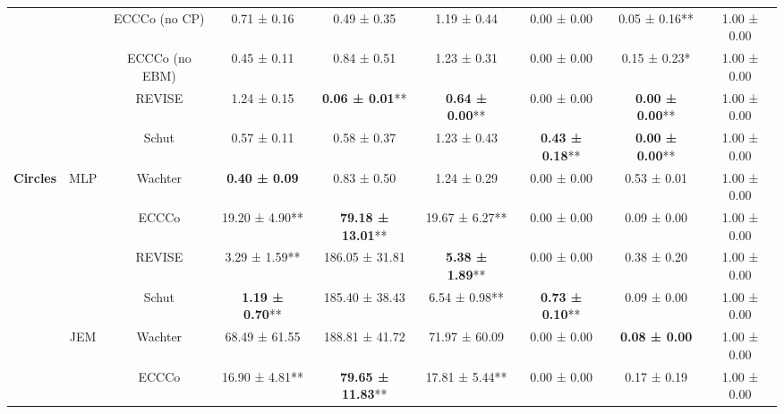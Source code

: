 \begin{table}
{\begin{tabular}[t]{>{}c|c|c|c|c|c|c|c|c}
 &  & ECCCo (no CP) & 0.71 ± 0.16\hphantom{*}\hphantom{*} & 0.49 ± 0.35\hphantom{*}\hphantom{*} & 1.19 ± 0.44\hphantom{*}\hphantom{*} & 0.00 ± 0.00\hphantom{*}\hphantom{*} & 0.05 ± 0.16** & 1.00 ± 0.00\hphantom{*}\hphantom{*}\\

 &  & ECCCo (no EBM) & 0.45 ± 0.11\hphantom{*}\hphantom{*} & 0.84 ± 0.51\hphantom{*}\hphantom{*} & 1.23 ± 0.31\hphantom{*}\hphantom{*} & 0.00 ± 0.00\hphantom{*}\hphantom{*} & 0.15 ± 0.23*\hphantom{*} & 1.00 ± 0.00\hphantom{*}\hphantom{*}\\

 &  & REVISE & 1.24 ± 0.15\hphantom{*}\hphantom{*} & \textbf{0.06 ± 0.01}** & \textbf{0.64 ± 0.00}** & 0.00 ± 0.00\hphantom{*}\hphantom{*} & \textbf{0.00 ± 0.00}** & 1.00 ± 0.00\hphantom{*}\hphantom{*}\\

 &  & Schut & 0.57 ± 0.11\hphantom{*}\hphantom{*} & 0.58 ± 0.37\hphantom{*}\hphantom{*} & 1.23 ± 0.43\hphantom{*}\hphantom{*} & \textbf{0.43 ± 0.18}** & \textbf{0.00 ± 0.00}** & 1.00 ± 0.00\hphantom{*}\hphantom{*}\\

\multirow{-12}{*}{\centering\arraybackslash \textbf{Circles}} & \multirow{-6}{*}{\centering\arraybackslash MLP} & Wachter & \textbf{0.40 ± 0.09}\hphantom{*}\hphantom{*} & 0.83 ± 0.50\hphantom{*}\hphantom{*} & 1.24 ± 0.29\hphantom{*}\hphantom{*} & 0.00 ± 0.00\hphantom{*}\hphantom{*} & 0.53 ± 0.01\hphantom{*}\hphantom{*} & 1.00 ± 0.00\hphantom{*}\hphantom{*}\\
\cline{1-9}
 &  & ECCCo & 19.20 ± 4.90** & \textbf{79.18 ± 13.01}** & 19.67 ± 6.27** & 0.00 ± 0.00\hphantom{*}\hphantom{*} & 0.09 ± 0.00\hphantom{*}\hphantom{*} & 1.00 ± 0.00\hphantom{*}\hphantom{*}\\

 &  & REVISE & 3.29 ± 1.59** & 186.05 ± 31.81\hphantom{*}\hphantom{*} & \textbf{5.38 ± 1.89}** & 0.00 ± 0.00\hphantom{*}\hphantom{*} & 0.38 ± 0.20\hphantom{*}\hphantom{*} & 1.00 ± 0.00\hphantom{*}\hphantom{*}\\

 &  & Schut & \textbf{1.19 ± 0.70}** & 185.40 ± 38.43\hphantom{*}\hphantom{*} & 6.54 ± 0.98** & \textbf{0.73 ± 0.10}** & 0.09 ± 0.00\hphantom{*}\hphantom{*} & 1.00 ± 0.00\hphantom{*}\hphantom{*}\\

 & \multirow{-4}{*}{\centering\arraybackslash JEM} & Wachter & 68.49 ± 61.55\hphantom{*}\hphantom{*} & 188.81 ± 41.72\hphantom{*}\hphantom{*} & 71.97 ± 60.09\hphantom{*}\hphantom{*} & 0.00 ± 0.00\hphantom{*}\hphantom{*} & \textbf{0.08 ± 0.00}\hphantom{*}\hphantom{*} & 1.00 ± 0.00\hphantom{*}\hphantom{*}\\
\cline{2-9}
 &  & ECCCo & 16.90 ± 4.81** & \textbf{79.65 ± 11.83}** & 17.81 ± 5.44** & 0.00 ± 0.00\hphantom{*}\hphantom{*} & 0.17 ± 0.19\hphantom{*}\hphantom{*} & 1.00 ± 0.00\hphantom{*}\hphantom{*}\\


\end{tabular}}
\end{table}
